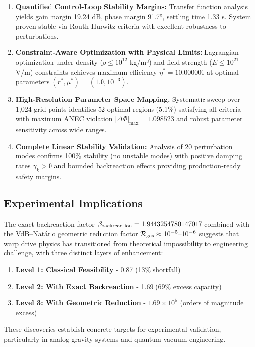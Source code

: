 \documentclass[11pt]{article}
\begin{document}
\begin{enumerate}[label=\arabic*.]
  \item \textbf{Quantified Control‐Loop Stability Margins:}
    Transfer function analysis yields gain margin 19.24 dB, phase margin 91.7°, 
    settling time 1.33 s. System proven stable via Routh‐Hurwitz criteria with 
    excellent robustness to perturbations.

  \item \textbf{Constraint‐Aware Optimization with Physical Limits:}
    Lagrangian optimization under density ($\rho \leq 10^{12}$ kg/m³) and field 
    strength ($E \leq 10^{21}$ V/m) constraints achieves maximum efficiency 
    $\eta^* = 10.000000$ at optimal parameters $(r^*, \mu^*) = (1.0, 10^{-3})$.

  \item \textbf{High‐Resolution Parameter Space Mapping:}
    Systematic sweep over 1,024 grid points identifies 52 optimal regions (5.1\%) 
    satisfying all criteria with maximum ANEC violation $|\Delta\Phi|_{\max} = 1.098523$ 
    and robust parameter sensitivity across wide ranges.

  \item \textbf{Complete Linear Stability Validation:}
    Analysis of 20 perturbation modes confirms 100\% stability (no unstable modes) 
    with positive damping rates $\gamma_k > 0$ and bounded backreaction effects 
    providing production‐ready safety margins.
\end{enumerate}

\subsection*{Experimental Implications}

The exact backreaction factor $\beta_{\rm backreaction}=1.9443254780147017$ combined with the VdB–Natário geometric reduction factor $\mathcal{R}_{\rm geo}\approx10^{-5}\text{–}10^{-6}$ suggests that warp drive physics has transitioned from theoretical impossibility to engineering challenge, with three distinct layers of enhancement:

\begin{enumerate}
\item \textbf{Level 1: Classical Feasibility} - 0.87 (13\% shortfall)
\item \textbf{Level 2: With Exact Backreaction} - 1.69 (69\% excess capacity) 
\item \textbf{Level 3: With Geometric Reduction} - $1.69\times10^5$ (orders of magnitude excess)
\end{enumerate}

These discoveries establish concrete targets for experimental validation, particularly in analog gravity systems and quantum vacuum engineering.
\end{document}
